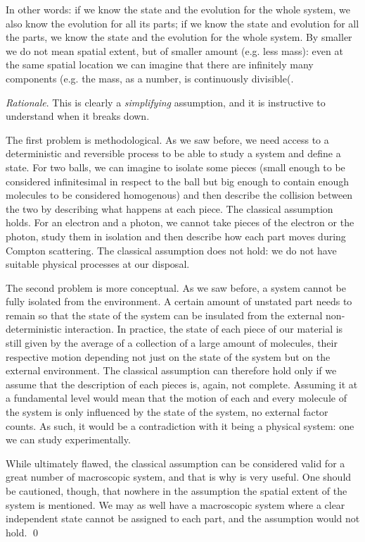 \documentclass[aps,pra,10pt,twocolumn,floatfix,nofootinbib]{revtex4-1}
\theoremstyle{definition}
\newenvironment{rationale}{\emph{Rationale}.}{\qed}
\begin{document}
In other words: if we know the state and the evolution for the whole system, we also know the evolution for all its parts; if we know the state and evolution for all the parts, we know the state and the evolution for the whole system. By smaller we do not mean spatial extent, but of smaller amount (e.g. less mass): even at the same spatial location we can imagine that there are infinitely many components (e.g. the mass, as a number, is continuously divisible(.

\begin{rationale}
This is clearly a \emph{simplifying} assumption, and it is instructive to understand when it breaks down.

The first problem is methodological. As we saw before, we need access to a deterministic and reversible process to be able to study a system and define a state. For two balls, we can imagine to isolate some pieces (small enough to be considered infinitesimal in respect to the ball but big enough to contain enough molecules to be considered homogenous) and then describe the collision between the two by describing what happens at each piece. The classical assumption holds. For an electron and a photon, we cannot take pieces of the electron or the photon, study them in isolation and then describe how each part moves during Compton scattering. The classical assumption does not hold: we do not have suitable physical processes at our disposal.

The second problem is more conceptual. As we saw before, a system cannot be fully isolated from the environment. A certain amount of unstated part needs to remain so that the state of the system can be insulated from the external non-deterministic interaction. In practice, the state of each piece of our material is still given by the average of a collection of a large amount of molecules, their respective motion depending not just on the state of the system but on the external environment.  The classical assumption can therefore hold only if we assume that the description of each pieces is, again, not complete. Assuming it at a fundamental level would mean that the motion of each and every molecule of the system is only influenced by the state of the system, no external factor counts. As such, it would be a contradiction with it being a physical system: one we can study experimentally.

While ultimately flawed, the classical assumption can be considered valid for a great number of macroscopic system, and that is why is very useful. One should be cautioned, though, that nowhere in the assumption the spatial extent of the system is mentioned. We may as well have a macroscopic system where a clear independent state cannot be assigned to each part, and the assumption would not hold.
\end{rationale}
\end{document}
